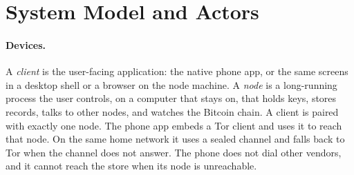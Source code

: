 \section{System Model and Actors}
\label{sec:model}

\paragraph{Devices.} A \emph{client} is the user-facing application: the native phone app, or the same screens in a desktop shell or a browser on the node machine. A \emph{node} is a long-running process the user controls, on a computer that stays on, that holds keys, stores records, talks to other nodes, and watches the Bitcoin chain. A client is paired with exactly one node. The phone app embeds a Tor client and uses it to reach that node. On the same home network it uses a sealed channel and falls back to Tor when the channel does not answer. The phone does not dial other vendors, and it cannot reach the store when its node is unreachable.

